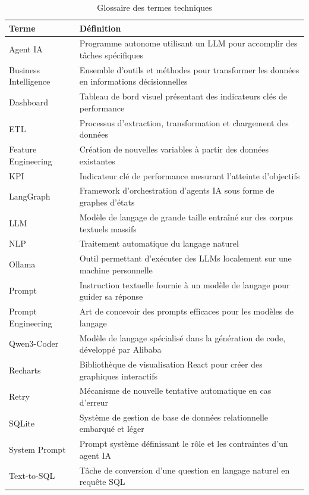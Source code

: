 \documentclass{rapportENSIAS}
\begin{document}
\begin{table}[H]
\centering
\caption{Glossaire des termes techniques}
\begin{tabularx}{\textwidth}{lX}
\toprule
\textbf{Terme} & \textbf{Définition} \\
\midrule
Agent IA & Programme autonome utilisant un LLM pour accomplir des tâches spécifiques \\
Business Intelligence & Ensemble d'outils et méthodes pour transformer les données en informations décisionnelles \\
Dashboard & Tableau de bord visuel présentant des indicateurs clés de performance \\
ETL & Processus d'extraction, transformation et chargement des données \\
Feature Engineering & Création de nouvelles variables à partir des données existantes \\
KPI & Indicateur clé de performance mesurant l'atteinte d'objectifs \\
LangGraph & Framework d'orchestration d'agents IA sous forme de graphes d'états \\
LLM & Modèle de langage de grande taille entraîné sur des corpus textuels massifs \\
NLP & Traitement automatique du langage naturel \\
Ollama & Outil permettant d'exécuter des LLMs localement sur une machine personnelle \\
Prompt & Instruction textuelle fournie à un modèle de langage pour guider sa réponse \\
Prompt Engineering & Art de concevoir des prompts efficaces pour les modèles de langage \\
Qwen3-Coder & Modèle de langage spécialisé dans la génération de code, développé par Alibaba \\
Recharts & Bibliothèque de visualisation React pour créer des graphiques interactifs \\
Retry & Mécanisme de nouvelle tentative automatique en cas d'erreur \\
SQLite & Système de gestion de base de données relationnelle embarqué et léger \\
System Prompt & Prompt système définissant le rôle et les contraintes d'un agent IA \\
Text-to-SQL & Tâche de conversion d'une question en langage naturel en requête SQL \\
\bottomrule
\end{tabularx}
\end{table}

\newpage






% 
% 
\end{document}

